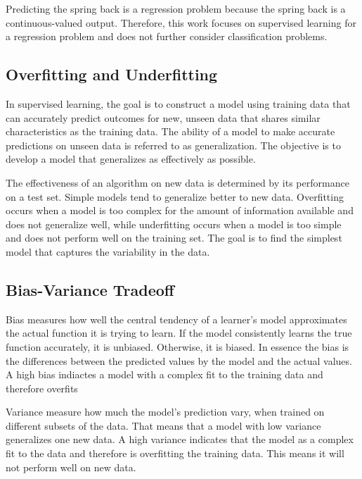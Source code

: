 Predicting the spring back is a regression problem because the spring back is a
continuous-valued
output.
Therefore, this work focuses on supervised learning for a regression problem and does
not further
consider classification problems.

\subsection{Overfitting and Underfitting}\label{subsec:overfitting-and-underfitting}
In supervised learning, the goal is to construct a model using training data that can
accurately
predict outcomes for new, unseen data that shares similar characteristics as the
training data.
The ability of a model to make accurate predictions on unseen data is referred to as
generalization. The objective is to develop a model that generalizes as effectively as
possible.
\cite[p. 35]{muller_introductionmachinelearning_2016}

The effectiveness of an algorithm on new data is determined by its performance on a
test set.
Simple models tend to generalize better to new data. Overfitting occurs when a model is
too
complex for the amount of information available and does not generalize well, while
underfitting
occurs when a model is too simple and does not perform well on the training set. The
goal is to
find the simplest model that captures the variability in the data.
\cite[p. 35]{muller_introductionmachinelearning_2016}

\subsection{Bias-Variance Tradeoff}\label{subsec:bias-variance-tradeoff}
Bias measures how well the central tendency of a learner's model approximates the
actual function
it is trying to learn. If the model consistently learns the true function accurately,
it is
unbiased. Otherwise, it is biased. \cite[p. 7-8]{neal_biasvariancetradeofftextbooks_2019}
In essence the bias is the differences between the predicted values by the model and
the actual
values.
A high bias indiactes a model with a complex fit to the training data and therefore
overfits
\cite[p. 20]{neal_biasvariancetradeofftextbooks_2019}

Variance measure how much the model's prediction vary, when trained on different
subsets of the
data. That means that a model with low variance generalizes one new data. A high variance
indicates that the model as a complex fit to the data and therefore is overfitting the
training
data. This means it will not perform well on new data. \cite[p.
7-8]{neal_biasvariancetradeofftextbooks_2019}

